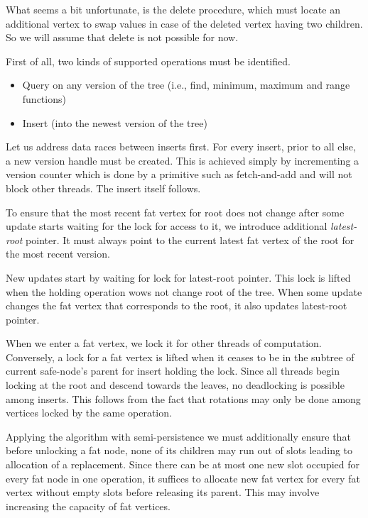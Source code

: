 What seems a bit unfortunate, is the delete procedure, which must locate an additional vertex to swap values in case of the deleted vertex having two children. So we will assume that delete is not possible for now.

First of all, two kinds of supported operations must be identified. 

\begin{itemize}
	\item Query on any version of the tree (i.e., find, minimum, maximum and range functions)
	\item Insert (into the newest version of the tree)
\end{itemize}

Let us address data races between inserts first. For every insert, prior to all else, a new version handle must be created. This is achieved simply by incrementing a version counter which is done by a primitive such as fetch-and-add and will not block other threads. The insert itself follows.

To ensure that the most recent fat vertex for root does not change after some update starts waiting for the lock for access to it, we introduce additional \emph{latest-root} pointer. It must always point to the current latest fat vertex of the root for the most recent version. 

New updates start by waiting for lock for latest-root pointer. This lock is lifted when the holding operation wows not change root of the tree. When some update changes the fat vertex that corresponds to the root, it also updates latest-root pointer.

When we enter a fat vertex, we lock it for other threads of computation. Conversely, a lock for a fat vertex is lifted when it ceases to be in the subtree of current safe-node's parent for insert holding the lock. Since all threads begin locking at the root and descend towards the leaves, no deadlocking is possible among inserts. This follows from the fact that rotations may only be done among vertices locked by the same operation.

Applying the algorithm with semi-persistence we must additionally ensure that before unlocking a fat node, none of its children may run out of slots leading to allocation of a replacement. Since there can be at most one new slot occupied for every fat node in one operation, it suffices to allocate new fat vertex for every fat vertex without empty slots before releasing its parent. This may involve increasing the capacity of fat vertices.

